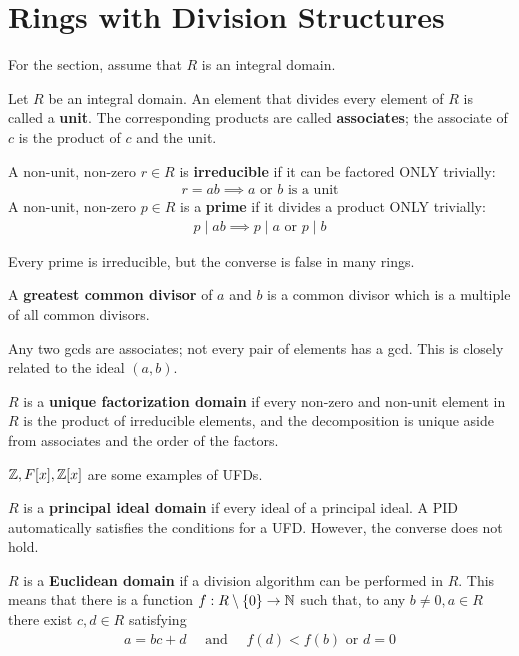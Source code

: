 \documentclass{memoir}
\begin{document}
\section{Rings with Division Structures}
\label{sec:number_theory_in_rings}
For the section, assume that \(R\) is an integral domain.
\begin{defn}
	Let \(R\) be an integral domain. An element that divides every element of \(R\) is called a \textbf{unit}. The corresponding products are called \textbf{associates}; the associate of \(c\) is the product of \(c\) and the unit.
\end{defn}
\begin{defn}
	A non-unit, non-zero \(r \in R\) is \textbf{irreducible} if it can be factored ONLY trivially:
	\begin{align*}
		r = ab \implies a \text{ or } b \text{ is a unit}
	\end{align*}
	A non-unit, non-zero \(p \in R\) is a \textbf{prime} if it divides a product ONLY trivially: 
	\begin{align*}
		p \mid ab \implies p \mid a \text{ or } p \mid b
	\end{align*}
\end{defn}
Every prime is irreducible, but the converse is false in many rings.
\begin{defn}
	A \textbf{greatest common divisor} of \(a\) and \(b\) is a common divisor which is a multiple of all common divisors.
\end{defn}
Any two gcds are associates; not every pair of elements has a gcd. This is closely related to the ideal \((a,b)\).
 \begin{defn}[UFD]
	\(R\) is a \textbf{unique factorization domain} if every non-zero and non-unit element in \(R\) is the product of irreducible elements, and the decomposition is unique aside from associates and the order of the factors.
\end{defn}
\(\mathbb{Z},F[x],\mathbb{Z}[x]\) are some examples of UFDs.
\begin{defn}[PID]
	\(R\) is a \textbf{principal ideal domain} if every ideal of a principal ideal. A PID automatically satisfies the conditions for a UFD. However, the converse does not hold.
\end{defn}
\begin{defn}[ED]
	\(R\) is a \textbf{Euclidean domain} if a division algorithm can be performed in \(R\). This means that there is a function \(f:R\setminus \left\{ 0 \right\} \to \mathbb{N}\) such that, to any \(b\neq 0, a \in R\) there exist \(c,d \in R\) satisfying
	\begin{align*}
		a = bc + d \quad \text{ and } \quad f(d) < f(b) \text{ or }d = 0
	\end{align*}
\end{defn} 
\end{document}
